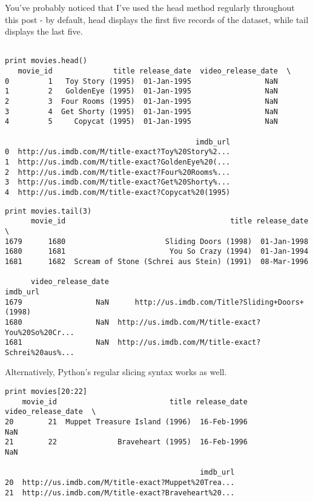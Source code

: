\documentclass[]{article}
\begin{document}
You've probably noticed that I've used the head method regularly throughout this post - by default, head displays the first five records of the dataset, while tail displays the last five.
\begin{framed}
\begin{verbatim}

print movies.head()
   movie_id              title release_date  video_release_date  \
0         1   Toy Story (1995)  01-Jan-1995                 NaN   
1         2   GoldenEye (1995)  01-Jan-1995                 NaN   
2         3  Four Rooms (1995)  01-Jan-1995                 NaN   
3         4  Get Shorty (1995)  01-Jan-1995                 NaN   
4         5     Copycat (1995)  01-Jan-1995                 NaN   

                                            imdb_url  
0  http://us.imdb.com/M/title-exact?Toy%20Story%2...  
1  http://us.imdb.com/M/title-exact?GoldenEye%20(...  
2  http://us.imdb.com/M/title-exact?Four%20Rooms%...  
3  http://us.imdb.com/M/title-exact?Get%20Shorty%...  
4  http://us.imdb.com/M/title-exact?Copycat%20(1995)  
\end{verbatim} 
\end{framed}
\begin{framed}
\begin{verbatim}
print movies.tail(3)
      movie_id                                      title release_date  \
1679      1680                       Sliding Doors (1998)  01-Jan-1998   
1680      1681                        You So Crazy (1994)  01-Jan-1994   
1681      1682  Scream of Stone (Schrei aus Stein) (1991)  08-Mar-1996   

      video_release_date                                           imdb_url  
1679                 NaN      http://us.imdb.com/Title?Sliding+Doors+(1998)  
1680                 NaN  http://us.imdb.com/M/title-exact?You%20So%20Cr...  
1681                 NaN  http://us.imdb.com/M/title-exact?Schrei%20aus%...  
\end{verbatim}
\end{framed}
Alternatively, Python's regular slicing syntax works as well.

\begin{verbatim}
print movies[20:22]
    movie_id                          title release_date  video_release_date  \
20        21  Muppet Treasure Island (1996)  16-Feb-1996                 NaN   
21        22              Braveheart (1995)  16-Feb-1996                 NaN   

                                             imdb_url  
20  http://us.imdb.com/M/title-exact?Muppet%20Trea...  
21  http://us.imdb.com/M/title-exact?Braveheart%20...  
\end{verbatim}
\newpage
\end{document}
